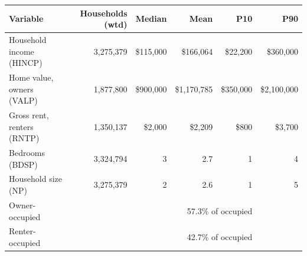 \begin{tabular}{lrrrrr}
\toprule
Variable & Households (wtd) & Median & Mean & P10 & P90 \\
\midrule
Household income (HINCP) & 3,275,379 & \$115,000 & \$166,064 & \$22,200 & \$360,000 \\
Home value, owners (VALP) & 1,877,800 & \$900,000 & \$1,170,785 & \$350,000 & \$2,100,000 \\
Gross rent, renters (RNTP) & 1,350,137 & \$2,000 & \$2,209 & \$800 & \$3,700 \\
Bedrooms (BDSP) & 3,324,794 & 3 & 2.7 & 1 & 4 \\
Household size (NP) & 3,275,379 & 2 & 2.6 & 1 & 5 \\
\midrule
Owner-occupied & \multicolumn{4}{r}{57.3\% of occupied} \\
Renter-occupied & \multicolumn{4}{r}{42.7\% of occupied} \\
\bottomrule
\end{tabular}
